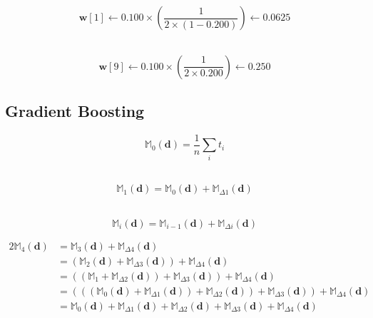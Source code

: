 \documentclass[xcolor={table}]{beamer}
\begin{document}
 \begin{frame} 
\begin{equation*}
\mathbf{w}\left[1\right] \leftarrow  0.100\times \left(\frac{1}{2 \times \left(1-0.200\right)}\right)   \leftarrow  0.0625  
\end{equation*}

~\\

\begin{equation*}
\mathbf{w}\left[9\right]  \leftarrow  0.100\times \left(\frac{1}{2 \times 0.200}\right)  \leftarrow 0.250 
\end{equation*}
\end{frame} 


\subsection{Gradient Boosting}


 \begin{frame} 
\begin{equation}
\mathbb{M}_{0}(\mathbf{d}) = \frac{1}{n}\sum_{i}t_i
\end{equation}

~\\

\begin{equation}
\mathbb{M}_{1}(\mathbf{d}) = \mathbb{M}_{0}(\mathbf{d}) + \mathbb{M}_{\Delta1}(\mathbf{d})
\label{eq:gb_first_iter}
\end{equation}

~\\

\begin{equation}
\mathbb{M}_{i}(\mathbf{d}) = \mathbb{M}_{i-1}(\mathbf{d}) + \mathbb{M}_{\Delta i}(\mathbf{d})
\label{eq:gb_recursion}
\end{equation}
\end{frame} 



 \begin{frame} 
\begin{alignat}{2}
\mathbb{M}_{4}(\mathbf{d}) & =  \mathbb{M}_{3}(\mathbf{d}) + \mathbb{M}_{\Delta 4}(\mathbf{d}) \nonumber \\
			 & = (\mathbb{M}_{2}(\mathbf{d}) + \mathbb{M}_{\Delta 3}(\mathbf{d})) + \mathbb{M}_{\Delta 4}(\mathbf{d}) \nonumber \\
			 & = ((\mathbb{M}_{1} + \mathbb{M}_{\Delta 2}(\mathbf{d})) + \mathbb{M}_{\Delta 3}(\mathbf{d})) + \mathbb{M}_{\Delta 4}(\mathbf{d})  \nonumber \\
			 & = (((\mathbb{M}_{0}(\mathbf{d}) + \mathbb{M}_{\Delta 1}(\mathbf{d})) + \mathbb{M}_{\Delta 2}(\mathbf{d})) + \mathbb{M}_{\Delta 3}(\mathbf{d})) + \mathbb{M}_{\Delta 4}(\mathbf{d}) \nonumber \\
			 & = \mathbb{M}_{0}(\mathbf{d}) + \mathbb{M}_{\Delta 1}(\mathbf{d}) + \mathbb{M}_{\Delta 2}(\mathbf{d}) + \mathbb{M}_{\Delta 3}(\mathbf{d}) + \mathbb{M}_{\Delta 4}(\mathbf{d})
\label{eq:gb_expansion}
\end{alignat}
\end{frame} 
\end{document}
